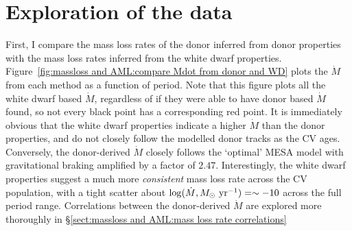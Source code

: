 \section{Exploration of the data}
\label{sect:massloss and AML:exploring massloss data}

First, I compare the mass loss rates of the donor inferred from donor properties with the mass loss rates inferred from the white dwarf properties.
Figure~\ref{fig:massloss and AML:compare Mdot from donor and WD} plots the $\dot M$ from each method as a function of period. Note that this figure plots all the white dwarf based $\dot M$, regardless of if they were able to have donor based $\dot M$ found, so not every black point has a corresponding red point.
It is immediately obvious that the white dwarf properties indicate a higher $\dot M$ than the donor properties, and do not closely follow the modelled donor tracks as the CV ages.
Conversely, the donor-derived $\dot M$ closely follows the `optimal' MESA model with gravitational braking amplified by a factor of $2.47$.
Interestingly, the white dwarf properties suggest a much more \textit{consistent} mass loss rate across the CV population, with a tight scatter about $\log (\dot M, M_\odot\ {\rm yr}^{-1}) = \sim -10$ across the full period range. Correlations between the donor-derived $\dot M$ are explored more thoroughly in \S\ref{sect:massloss and AML:mass loss rate correlations}

